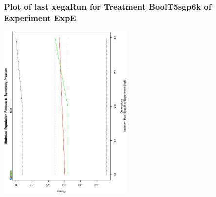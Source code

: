  \begin{frame}
 \frametitle{ Plot of last xegaRun for Treatment BoolT5sgp6k of Experiment ExpE }
 \begin{center}
\includegraphics[width=0.5\textwidth, angle=-90]
{ExpEPlotPopStatsFigure009.eps}
 \end{center}
 \label{report/ExpEPlotPopStatsFigure009.eps}  
 \end{frame}

